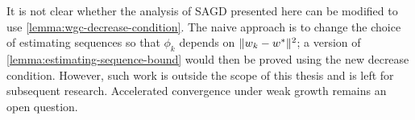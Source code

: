 It is not clear whether the analysis of \ac{SAGD} presented here can be modified to use \autoref{lemma:wgc-decrease-condition}. 
The naive approach is to change the choice of estimating sequences so that \( \phi_k \)  depends on \( \|w_k - w^*\|^2 \); a version of \autoref{lemma:estimating-sequence-bound} would then be proved using the new decrease condition.
However, such work is outside the scope of this thesis and is left for subsequent research.
Accelerated convergence under weak growth remains an open question.



